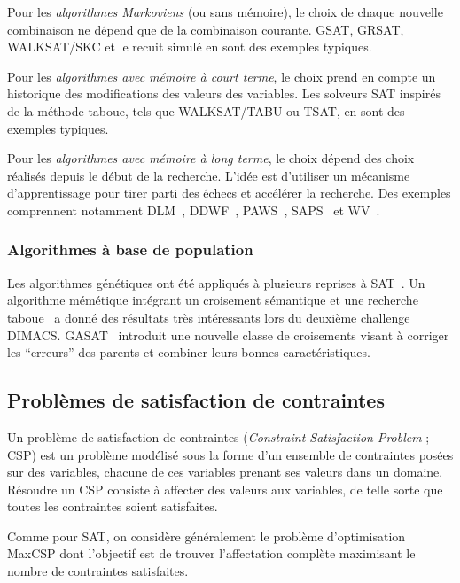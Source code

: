 \documentclass[12pt,a4paper]{book}
\begin{document}
Pour les \textit{algorithmes Markoviens} (ou sans mémoire), le choix de chaque nouvelle combinaison ne dépend que de la combinaison courante. GSAT, GRSAT, WALKSAT/SKC et le recuit simulé en sont des exemples typiques.

Pour les \textit{algorithmes avec mémoire à court terme}, le choix prend en compte un historique des modifications des valeurs des variables. Les solveurs SAT inspirés de la méthode taboue, tels que WALKSAT/TABU ou TSAT, en sont des exemples typiques.

Pour les \textit{algorithmes avec mémoire à long terme}, le choix dépend des choix réalisés depuis le début de la recherche. L'idée est d'utiliser un mécanisme d'apprentissage pour tirer parti des échecs et accélérer la recherche. Des exemples comprennent notamment DLM~\cite{shang1998}, DDWF~\cite{ishtaiwi2005}, PAWS~\cite{thornton2004}, SAPS~\cite{hutter2002} et WV~\cite{prestwich2005}.

\subsubsection*{Algorithmes à base de population}

Les algorithmes génétiques ont été appliqués à plusieurs reprises à SAT~\cite{dejong1989,crawford1993,hao1994}. Un algorithme mémétique intégrant un croisement sémantique et une recherche taboue~\cite{fleurent1996} a donné des résultats très intéressants lors du deuxième challenge DIMACS. GASAT~\cite{lardeux2006} introduit une nouvelle classe de croisements visant à corriger les ``erreurs'' des parents et combiner leurs bonnes caractéristiques.

\subsection{Problèmes de satisfaction de contraintes}
\label{sec:csp}

Un problème de satisfaction de contraintes (\textit{Constraint Satisfaction Problem} ; CSP) est un problème modélisé sous la forme d'un ensemble de contraintes posées sur des variables, chacune de ces variables prenant ses valeurs dans un domaine. Résoudre un CSP consiste à affecter des valeurs aux variables, de telle sorte que toutes les contraintes soient satisfaites.

Comme pour SAT, on considère généralement le problème d'optimisation MaxCSP dont l'objectif est de trouver l'affectation complète maximisant le nombre de contraintes satisfaites.
\end{document}
